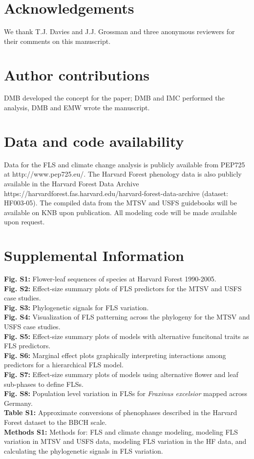 \documentclass[11pt]{article}
\begin{document}
\section*{Acknowledgements}
\noindent We thank T.J. Davies and J.J. Grossman and three anonymous reviewers for their comments on this manuscript.

\section*{Author contributions}
DMB developed the concept for the paper; DMB and IMC performed the analysis, DMB and EMW wrote the manuscript.

\section*{Data and code availability}
Data for the FLS and climate change analysis is publicly available from PEP725 at http://www.pep725.eu/. The Harvard Forest phenology data is also publicly available in the Harvard Forest Data Archive https://harvardforest.fas.harvard.edu/harvard-forest-data-archive (dataset: HF003-05). The compiled data from the MTSV and USFS guidebooks will be available on KNB upon publication. All modeling code will be made available upon request. %





\newpage
\section*{Supplemental Information}
\textbf{Fig. S1:} Flower-leaf sequences of species at Harvard Forest 1990-2005.\\
\textbf{Fig. S2:} Effect-size summary plots of FLS predictors for the MTSV and USFS case studies. \\
\textbf{Fig. S3:} Phylogenetic signals for FLS variation.\\
\textbf{Fig. S4:} Visualization of FLS patterning across the phylogeny for the MTSV and USFS case studies.\\
\textbf{Fig. S5:} Effect-size summary plots of models with alternative funcitonal traits as FLS predictors.\\
\textbf{Fig. S6:} Marginal effect plots graphically interpreting interactions among predictors for a hierarchical FLS model.\\
\textbf{Fig. S7:} Effect-size summary plots of models using alternative flower and leaf sub-phases to define FLSs.\\
\textbf{Fig. S8:} Population level variation in FLSs for \emph{Fraxinus excelsior} mapped across Germany.\\
\textbf{Table S1:} Approximate conversions of phenophases described in the Harvard Forest dataset to the BBCH scale.\\
\textbf{Methods S1:} Methods for: FLS and climate change modeling, modeling FLS variation in MTSV and USFS data, modeling FLS variation in the HF data, and calculating the phylogenetic signals in FLS variation.
\newpage
\end{document}
